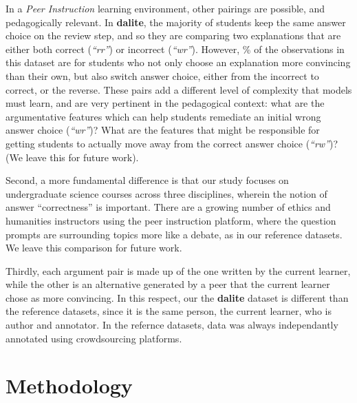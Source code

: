 \documentclass[runningheads]{llncs}
\begin{document}
In a \textit{Peer Instruction} learning environment, other pairings are 
possible, and pedagogically relevant. 
In \textbf{dalite}, the majority of students keep the same answer choice 
on the review step, and so they are comparing two explanations that 
are either both correct (\textit{``rr''}) or incorrect (\textit{``wr''}). 
However, \% of the 
observations in this dataset are for students who not only choose an 
explanation more convincing than their own, but also switch answer choice, 
either from the incorrect to correct, or the reverse. 
These pairs add a different level of complexity that models must learn, and are 
very pertinent in the pedagogical context: what are the argumentative features 
which can help students remediate an initial wrong answer choice 
(\textit{``wr''})?
What are the features that might be responsible for getting students to 
actually move away from the correct answer choice (\textit{``rw''})?
(We leave this for future work).
 
Second, a more fundamental difference is that our study focuses on 
undergraduate science courses across three disciplines, wherein the notion of 
answer ``correctness'' is important.
There are a growing number of ethics and humanities instructors using the peer 
instruction platform, where the question prompts are surrounding topics more 
like a debate, as in our reference datasets. 
We leave this comparison for future work.

Thirdly, each argument pair is made up of the one written by the current 
learner, while the other is an alternative generated by a peer that the current 
learner chose as more convincing. 
In this respect, our the \textbf{dalite} dataset is different than the 
reference datasets, since it is the same person, the current learner, who is 
author and annotator. In the refernce datasets, data was always independantly 
annotated using crowdsourcing platforms.


\section{Methodology}
\end{document}
